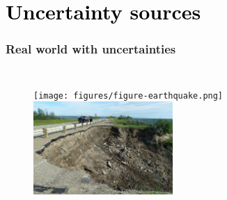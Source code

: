 
\section{\textcolor{black}{Uncertainty sources}} %



\begin{frame}
	\frametitle{Real world with uncertainties}
\begin{columns}
            
    \begin{figure}
    \texttt{[image: figures/figure-earthquake.png]}    
    \includegraphics[width = 5.3cm]{figures/figure-embankment.png}    
    \end{figure}    
\end{columns}
\end{frame}


